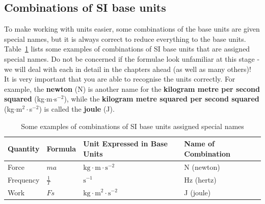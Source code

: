 \subsection*{Combinations of SI base units}
            \nopagebreak
To make working with units easier, some combinations of the base units are given special names, but it is always correct to reduce everything to the base units. Table~\ref{tab:SIcombinations} lists some examples of combinations of SI base units that are assigned special names. Do not be concerned if the formulae look unfamiliar at this stage - we will deal with each in detail in the chapters ahead (as well as many others)! \\ 
It is very important that you are able to recognise the units correctly. For example, the \textbf{newton} (N) is another name for the \textbf{kilogram metre per second squared} (kg$\ensuremath{\cdot}$m$\ensuremath{\cdot}$s${}^{-2}$), while the \textbf{kilogram metre squared per second squared} (kg$\ensuremath{\cdot}$m${}^{2}\ensuremath{\cdot}$s${}^{-2}$) is called the \textbf{joule} (J).
          \begin{table}[H]
        \begin{center}
\noindent
      \begin{tabular}{|l|l|l|l|}\hline
\textbf{Quantity} & \textbf{Formula} & \textbf{Unit Expressed in Base Units}              & \textbf{Name of Combination} \\ \hline
Force             & $ma$             & $\text{kg}\cdot \text{m} \cdot \text{s}^{-2}$      & N (newton)                   \\ \hline
Frequency         & $\frac{1}{T}$    & $\text{s}^{-1}$                                    & Hz (hertz)                   \\ \hline
Work              & $Fs$             & $\text{kg} \cdot \text{m}^{2} \cdot \text{s}^{-2}$ & J (joule)                    \\ \hline
    \end{tabular}
\caption{Some examples of combinations of SI base units assigned special names}
\label{tab:SIcombinations}
      \end{center}
\end{table}
    \par
\label{m30853*notfhsst!!!underscore!!!id306}
